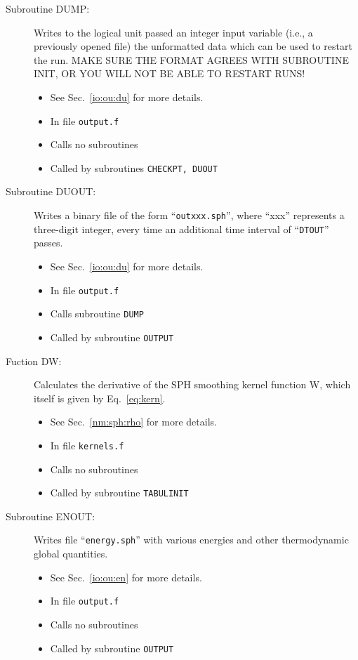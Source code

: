 \begin{description}
\item[Subroutine DUMP:] Writes to the logical unit passed an integer
input variable (i.e., a previously opened file) the unformatted
data which can be used to restart the run.  MAKE SURE THE FORMAT AGREES WITH
SUBROUTINE INIT, OR YOU WILL NOT BE ABLE TO RESTART RUNS!
\begin{itemize} 
\item See Sec.~\ref{io:ou:du} for more details.
\item In file {\tt output.f}
\item Calls no subroutines
\item Called by subroutines {\tt CHECKPT, DUOUT} 
\end{itemize} 

\item[Subroutine DUOUT:] Writes a binary file of the form
``{\tt outxxx.sph}'', where ``xxx'' represents a three-digit integer,
every time an additional time interval of ``{\tt DTOUT}'' passes.
\begin{itemize} 
\item See Sec.~\ref{io:ou:du} for more details.
\item In file {\tt output.f}
\item Calls subroutine {\tt DUMP}
\item Called by subroutine {\tt OUTPUT}
\end{itemize} 

\item[Fuction DW:] Calculates the derivative of the SPH smoothing
kernel function W, which itself is given by Eq.~\ref{eq:kern}.
\begin{itemize} 
\item See Sec.~\ref{nm:sph:rho} for more details.
\item In file {\tt kernels.f}
\item Calls no subroutines
\item Called by subroutine {\tt TABULINIT}
\end{itemize} 

\item[Subroutine ENOUT:] Writes file ``{\tt energy.sph}'' with 
various energies and other thermodynamic global quantities.
\begin{itemize} 
\item See Sec.~\ref{io:ou:en} for more details.
\item In file {\tt output.f}
\item Calls no subroutines 
\item Called by subroutine {\tt OUTPUT}
\end{itemize}


\end{description}
